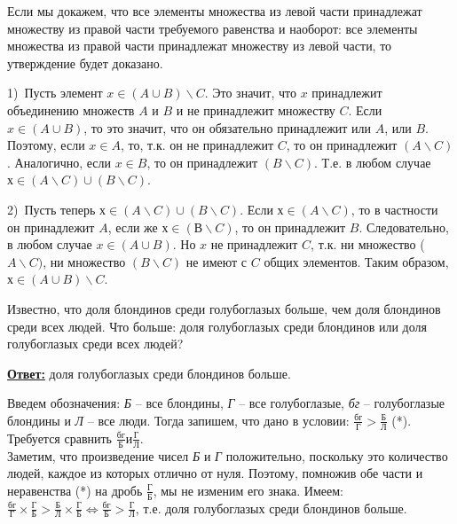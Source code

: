 \begin{prf}
Если мы докажем, что все элементы множества из левой части принадлежат множеству из правой части требуемого равенства и наоборот: все элементы множества из правой части принадлежат множеству из левой части, то утверждение будет доказано.

1)~Пусть элемент $x \in (A \cup B) \backslash C$. Это значит, что $x$ принадлежит объединению множеств $A$ и $B$ и не принадлежит множеству $C$. Если $x \in (A \cup B)$, то это значит, что он обязательно принадлежит или $A$, или $B$. Поэтому, если $x \in A$, то, т.к. он не принадлежит $C$, то он принадлежит $(A \backslash C)$. Аналогично, если $x \in B$, то он принадлежит $(B \backslash C)$. Т.е. в любом случае $х \in (A \backslash C) \cup (B \backslash C)$.

2)~Пусть теперь $х \in (A \backslash C) \cup (B \backslash C)$. Если $х \in (A \backslash C)$, то в частности он принадлежит $A$, если же $х \in (В \backslash C)$, то он принадлежит $B$. Следовательно, в любом случае $x \in (A \cup B)$. Но $x$ не принадлежит $C$, т.к. ни множество ($A \backslash C)$, ни множество $(B \backslash C)$ не имеют с $C$ общих элементов. Таким образом, $х \in (A \cup B) \backslash C$. 
\end{prf}

\begin{thm} 
Известно, что доля блондинов среди голубоглазых больше, чем доля блондинов среди всех людей. Что больше: доля голубоглазых среди блондинов или доля голубоглазых среди всех людей?
\end{thm}
\par
\textbf{\underline{Ответ:}} доля голубоглазых среди блондинов больше.

\begin{prf}
Введем обозначения: \textit{Б} – все блондины, \textit{Г} – все голубоглазые, \textit{бг} – голубоглазые блондины и \textit{Л} – все люди. Тогда запишем, что дано в условии: $\frac{\textit{бг}}{\textit{Г}} > \frac{\textit{Б}}{\textit{Л}}$ (*). Требуется сравнить $\frac{\textit{бг}}{\textit{Б}} и \frac{\textit{Г}}{\textit{Л}}$. \\
Заметим, что произведение чисел \textit{Б} и \textit{Г} положительно, поскольку это количество людей, каждое из которых отлично от нуля. Поэтому, помножив обе части и неравенства (*) на дробь $\frac{\textit{Г}}{\textit{Б}}$, мы не изменим его знака. Имеем:
$\frac{\textit{бг}}{\textit{Г}} \times \frac{\textit{Г}}{\textit{Б}} > \frac{\textit{Б}}{\textit{Л}} \times \frac{\textit{Г}}{\textit{Б}} \Leftrightarrow \frac{\textit{бг}}{\textit{Б}} > \frac{\textit{Г}}{\textit{Л}}$, т.е. доля голубоглазых среди блондинов больше.
\end{prf}

